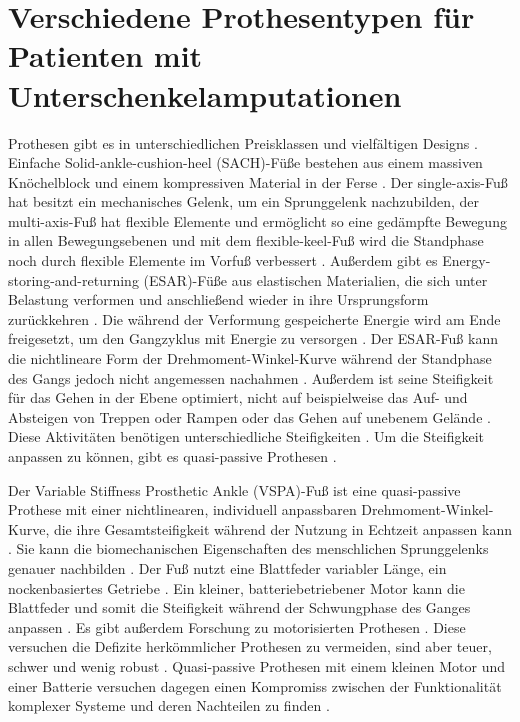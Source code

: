 \section{Verschiedene Prothesentypen für Patienten mit Unterschenkelamputationen}  %
Prothesen gibt es in unterschiedlichen Preisklassen und vielfältigen Designs \cite{Stevens.2018}.
Einfache Solid-ankle-cushion-heel (SACH)-Füße bestehen aus einem massiven Knöchelblock und einem kompressiven Material in der Ferse \cite{Stevens.2018}. Der single-axis-Fuß hat besitzt ein mechanisches Gelenk, um ein Sprunggelenk nachzubilden, der multi-axis-Fuß hat flexible Elemente und ermöglicht so eine gedämpfte Bewegung in allen Bewegungsebenen und mit dem flexible-keel-Fuß wird die Standphase noch durch flexible Elemente im Vorfuß verbessert \cite{Stevens.2018}. 
Außerdem gibt es Energy-storing-and-returning (ESAR)-Füße aus elastischen Materialien, die sich unter Belastung verformen und anschließend wieder in ihre Ursprungsform zurückkehren \cite{Stevens.2018}. Die während der Verformung gespeicherte Energie wird am Ende freigesetzt, um den Gangzyklus mit Energie zu versorgen \cite{Stevens.2018}. 
Der ESAR-Fuß kann die nichtlineare Form der Drehmoment-Winkel-Kurve während der Standphase des Gangs jedoch nicht angemessen nachahmen \cite{Shepherd.2017}. Außerdem ist seine Steifigkeit für das Gehen in der Ebene optimiert, nicht auf beispielweise das Auf- und Absteigen von Treppen oder Rampen oder das Gehen auf unebenem Gelände \cite{Shepherd.2017}. Diese Aktivitäten benötigen unterschiedliche Steifigkeiten \cite{Shepherd.2017}. Um die Steifigkeit anpassen zu können, gibt es quasi-passive Prothesen \cite{Shepherd.2017}.

Der Variable Stiffness Prosthetic Ankle (VSPA)-Fuß ist eine quasi-passive Prothese mit einer nichtlinearen, individuell anpassbaren Drehmoment-Winkel-Kurve, die ihre Gesamtsteifigkeit während der Nutzung in Echtzeit anpassen kann \cite{Shepherd.2017}. Sie kann die biomechanischen Eigenschaften des menschlichen Sprunggelenks genauer nachbilden \cite{Shepherd.2017}. Der Fuß nutzt eine Blattfeder variabler Länge, ein nockenbasiertes Getriebe \cite{Shetty.2022}. Ein kleiner, batteriebetriebener Motor kann die Blattfeder und somit die Steifigkeit während der Schwungphase des Ganges anpassen \cite{Shetty.2022}. %
Es gibt außerdem Forschung zu motorisierten Prothesen \cite{Shetty.2022}. Diese versuchen die Defizite herkömmlicher Prothesen zu vermeiden, sind aber teuer, schwer und wenig robust \cite{Shetty.2022}. Quasi-passive Prothesen mit einem kleinen Motor und einer Batterie versuchen dagegen einen Kompromiss zwischen der Funktionalität komplexer Systeme und deren Nachteilen zu finden \cite{Shetty.2022}. 

